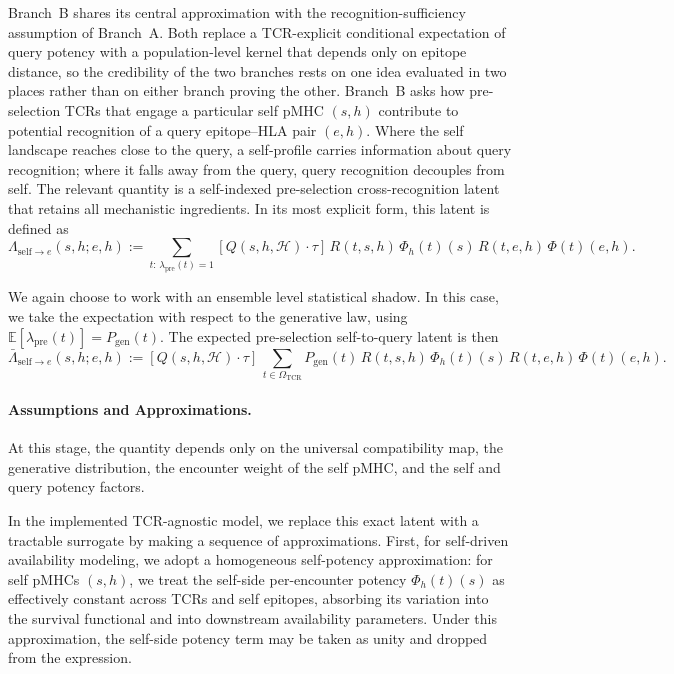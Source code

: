 \documentclass[11pt]{article}
\begin{document}
Branch~B shares its central approximation with the recognition-sufficiency assumption of Branch~A. Both replace a TCR-explicit conditional expectation of query potency with a population-level kernel that depends only on epitope distance, so the credibility of the two branches rests on one idea evaluated in two places rather than on either branch proving the other. Branch~B asks how pre-selection TCRs that engage a particular self pMHC \((s,h)\) contribute to potential recognition of a query epitope--HLA pair \((e,h)\). Where the self landscape reaches close to the query, a self-profile carries information about query recognition; where it falls away from the query, query recognition decouples from self. The relevant quantity is a self-indexed pre-selection cross-recognition latent that retains all mechanistic ingredients. In its most explicit form, this latent is defined as
\[
\Lambda_{\mathrm{self}\to e}(s,h; e,h)
:=
\sum_{t:\,\lambda_{\mathrm{pre}}(t)=1}
[Q(s,h,\mathcal{H})\cdot \tau]\,
R(t,s,h)\,
\Phi_{h}(t)(s)\,
R(t,e,h)\,
\Phi(t)(e,h).
\]

We again choose to work with an ensemble level statistical shadow. In this case, we take the expectation with respect to the generative law, using \(\mathbb{E}[\lambda_{\mathrm{pre}}(t)] = P_{\mathrm{gen}}(t)\). The expected pre-selection self-to-query latent is then
\[
\bar{\Lambda}_{\mathrm{self}\to e}(s,h; e,h)
:=
[Q(s,h,\mathcal{H})\cdot \tau]\,
\sum_{t\in\Omega_{\mathrm{TCR}}}
P_{\mathrm{gen}}(t)\,
R(t,s,h)\,
\Phi_{h}(t)(s)\,
R(t,e,h)\,
\Phi(t)(e,h).
\]

\paragraph{Assumptions and Approximations.}
At this stage, the quantity depends only on the universal compatibility map, the generative distribution, the encounter weight of the self pMHC, and the self and query potency factors.

In the implemented TCR-agnostic model, we replace this exact latent with a tractable surrogate by making a sequence of approximations. First, for self-driven availability modeling, we adopt a homogeneous self-potency approximation: for self pMHCs \((s,h)\), we treat the self-side per-encounter potency \(\Phi_{h}(t)(s)\) as effectively constant across TCRs and self epitopes, absorbing its variation into the survival functional and into downstream availability parameters. Under this approximation, the self-side potency term may be taken as unity and dropped from the expression.
\end{document}
